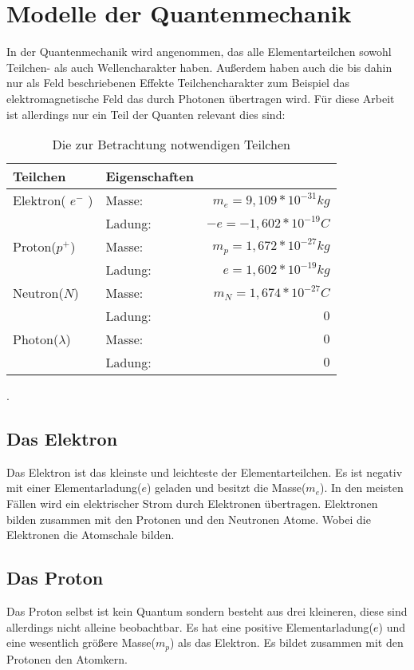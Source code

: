 \documentclass[11pt,a4paper,oneside]{report}
\begin{document}
\section{Modelle der Quantenmechanik}
In der Quantenmechanik wird angenommen, das alle Elementarteilchen sowohl Teilchen- als auch Wellencharakter haben. Außerdem haben auch die bis dahin nur als Feld beschriebenen Effekte Teilchencharakter zum Beispiel das elektromagnetische Feld das durch Photonen übertragen wird.
Für diese Arbeit ist allerdings nur ein Teil der Quanten relevant dies sind:
\begin{table}[h]
\centering
\begin{tabular}{|l|lr|} \hline
Teilchen 				& Eigenschaften 	&  						\\  \hline
Elektron( $e^-$ ) 		& Masse: 			& $m_e=9,109*10^{-31}kg$	\\
					& Ladung: 		& $-e=-1,602*10^{-19}C$	\\ \hline
Proton($p^+$) 		& Masse: 			& $m_p=1,672*10^{-27}kg$ 	\\
 					& Ladung: 		& $e=1,602*10^{-19}kg$	\\ \hline 
Neutron($N$)			& Masse:			& $m_N=1,674*10^{-27}C$	\\ 
					& Ladung:		& $0$					\\ \hline
Photon($ \lambda $) 	& Masse: 			& $0$					\\ 
					&Ladung:			& $0$					\\ \hline
\end{tabular}
\caption{Die zur Betrachtung notwendigen Teilchen\cite[S. 433]{stroppe08}}.
\end{table}

\subsection{Das Elektron}
Das Elektron ist das kleinste und leichteste der Elementarteilchen. Es ist negativ mit einer Elementarladung($e$) geladen und besitzt die Masse($m_e$). In den meisten Fällen wird ein elektrischer Strom durch Elektronen übertragen. Elektronen bilden zusammen mit den Protonen und den Neutronen Atome. Wobei die Elektronen die Atomschale bilden.

\subsection{Das Proton}
Das Proton selbst ist kein Quantum sondern besteht aus drei kleineren, diese sind allerdings nicht alleine beobachtbar. Es hat eine positive Elementarladung($e$) und eine wesentlich größere Masse($m_p$) als das Elektron. Es bildet zusammen mit den Protonen den Atomkern.
\end{document}
